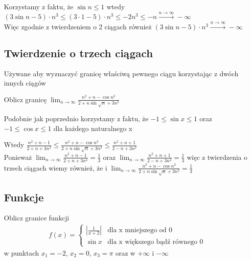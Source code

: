 \documentclass[12pt]{article}
\begin{document}
    \noindent Korzystamy z faktu, że $\sin{n} \leq 1$ wtedy \\
    $(3 \sin{n} - 5) \cdot n^{3}  \leq  (3\cdot 1 - 5) \cdot n^{3}  \leq  -2n^{3}  \leq  -n \stackrel{n \to \infty}{\longrightarrow} -\infty$ \\
    Więc zgodnie z twierdzeniem o 2 ciągach również $(3 \sin{n} - 5) \cdot n^{3} \stackrel{n \to \infty}{\longrightarrow} -\infty$

    \subsection{Twierdzenie o trzech ciągach}

    Używane aby wyznaczyć granicę właściwą pewnego ciągu korzystając z dwóch innych ciągów

    \begin{exercise}
		Oblicz granicę $\lim_{n\to \infty}{\frac{n^2+n-\cos{n^2}}{2+n\sin{\sqrt{n}}+3n^2}}$
	\end{exercise}

    \noindent Podobnie jak poprzednio korzystamy z faktu, że $-1 \leq \sin{x} \leq 1$ oraz $-1 \leq \cos{x} \leq 1$ dla każdego naturalnego x

    \noindent Wtedy $\frac{n^2+n-1}{2+n+3n^2} \leq \frac{n^2+n- \cos{n^2}}{2+n \sin{\sqrt{n}}+3n^2} \leq \frac{n^2+n+1}{2-n+3n^2}$ \\

    \noindent Ponieważ $\lim_{n\to \infty} \frac{n^2+n-1}{2+n+3n^2} = \frac{1}{3}$ oraz $\lim_{n\to \infty} \frac{n^2+n+1}{2-n+3n^2} = \frac{1}{3}$
    więc z twierdzenia o trzech ciągach wiemy również, że i $\lim_{n\to \infty}{\frac{n^2+n-\cos{n^2}}{2+n\sin{\sqrt{n}}+3n^2}} = \frac{1}{3}$


    \subsection{Funkcje}

	\begin{exercise}
    Oblicz granice funkcji
    \begin{align*}
        f(x) =
        \begin{cases}
            |\frac{1}{x+2}| & \text{dla x mniejszego od 0} \\
            \sin{x} & \text{dla x większego bądź równego 0}
        \end{cases}
    \end{align*}
    w punktach $x_{1} = -2$, $x_{2} = 0$, $x_{3} = \pi$ oraz w $+\infty$ i $-\infty$
	\end{exercise}
\end{document}
